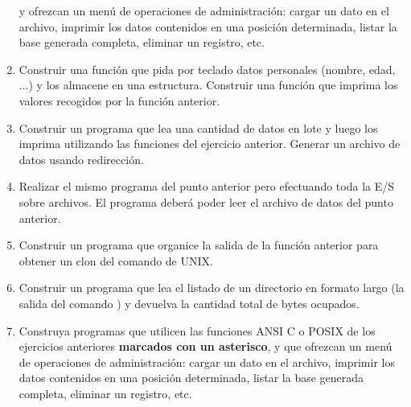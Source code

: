 \begin{enumerate}
y ofrezcan un menú de operaciones de administración: cargar un dato en el
archivo, imprimir los datos contenidos en una posición determinada, listar la
base generada completa, eliminar un registro, etc.
\item Construir una función que pida por teclado datos personales (nombre, edad, ...) y los almacene en una estructura. Construir una función que imprima los valores recogidos por la función anterior. 
\item Construir un programa que lea una cantidad de datos en lote y luego los imprima utilizando las funciones del ejercicio anterior. Generar un archivo de datos usando redirección.
\item Realizar el mismo programa del punto anterior pero efectuando toda la E/S sobre archivos. El programa deberá poder leer el archivo de datos del punto anterior.
\item Construir un programa que organice la salida de la función anterior para obtener un clon del comando  de UNIX.
\item Construir un programa que lea el listado de un directorio en formato largo (la salida del comando ) y devuelva la cantidad total de bytes ocupados.
\item Construya programas que utilicen las funciones ANSI C o POSIX de los ejercicios anteriores \textbf{marcados con un asterisco}, y que ofrezcan un menú de operaciones de administración: cargar un dato en el archivo, imprimir los datos contenidos en una posición determinada, listar la base generada completa, eliminar un registro, etc.
\end{enumerate}



